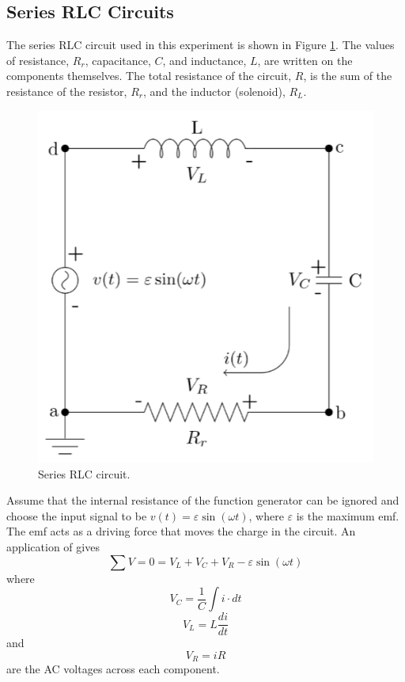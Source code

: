\subsection{Series RLC Circuits}

The series RLC circuit used in this experiment is shown in Figure \ref{fig:Res2}. The values of resistance, $R_r$, capacitance, $C$, and inductance, $L$, are written on the components themselves. The total resistance of the circuit, $R$, is the sum of the resistance of the resistor, $R_r$, and the inductor (solenoid), $R_L$.

\begin{figure}[H]
    \centering
    \includegraphics[scale = 0.8]{Images/Res2.PNG}
    \caption{Series RLC circuit.}
    \label{fig:Res2}
\end{figure}

Assume that the internal resistance of the function generator can be ignored and choose the input signal to be $v(t) = \varepsilon\sin(\omega t)$, where $\varepsilon$ is the maximum emf. The emf acts as a driving force that moves the charge in the circuit. An application of  gives \begin{equation}\label{eq:Res1}
    \sum V = 0 = V_L + V_C + V_R - \varepsilon\sin(\omega t)
\end{equation}
where \begin{equation}\label{eq:Res2}
    V_C = \frac{1}{C}\int i\cdot dt 
\end{equation}
\begin{equation}\label{eq:Res3}
    V_L = L\frac{di}{dt}
\end{equation}
and \begin{equation}\label{eq:Res4}
    V_R = iR
\end{equation}
are the AC voltages across each component.

